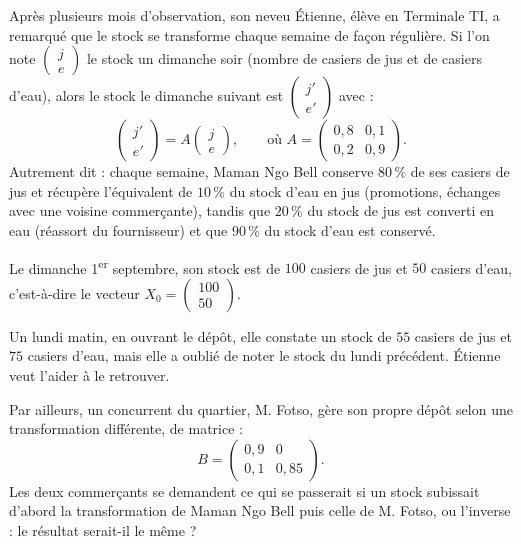 \documentclass[11pt]{article}
\begin{document}
Après plusieurs mois d'observation, son neveu Étienne, élève en Terminale TI, a remarqué que le stock se transforme chaque semaine de façon régulière. Si l'on note $\begin{pmatrix} j \\ e \end{pmatrix}$ le stock un dimanche soir (nombre de casiers de jus et de casiers d'eau), alors le stock le dimanche suivant est $\begin{pmatrix} j' \\ e' \end{pmatrix}$ avec :
\[
\begin{pmatrix} j' \\ e' \end{pmatrix} = A \begin{pmatrix} j \\ e \end{pmatrix}, \qquad \text{où } A = \begin{pmatrix} 0,8 & 0,1 \\ 0,2 & 0,9 \end{pmatrix}.
\]
Autrement dit : chaque semaine, Maman Ngo Bell conserve $80\,\%$ de ses casiers de jus et récupère l'équivalent de $10\,\%$ du stock d'eau en jus (promotions, échanges avec une voisine commerçante), tandis que $20\,\%$ du stock de jus est converti en eau (réassort du fournisseur) et que $90\,\%$ du stock d'eau est conservé.

Le dimanche 1\textsuperscript{er} septembre, son stock est de $100$ casiers de jus et $50$ casiers d'eau, c'est-à-dire le vecteur $X_0 = \begin{pmatrix} 100 \\ 50 \end{pmatrix}$.

Un lundi matin, en ouvrant le dépôt, elle constate un stock de $55$ casiers de jus et $75$ casiers d'eau, mais elle a oublié de noter le stock du lundi précédent. Étienne veut l'aider à le retrouver.

Par ailleurs, un concurrent du quartier, M. Fotso, gère son propre dépôt selon une transformation différente, de matrice :
\[
B = \begin{pmatrix} 0,9 & 0 \\ 0,1 & 0,85 \end{pmatrix}.
\]
Les deux commerçants se demandent ce qui se passerait si un stock subissait d'abord la transformation de Maman Ngo Bell puis celle de M. Fotso, ou l'inverse : le résultat serait-il le même ?
\end{document}
